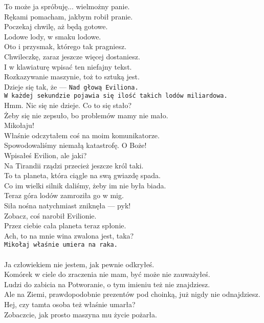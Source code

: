 \charmik{}
To może ja spróbuję... wielmożny panie.\\
Rękami pomacham, jakbym robił pranie.\\
Poczekaj chwilę, aż będą gotowe.\\
Lodowe lody, w smaku lodowe.\\
Oto i przysmak, którego tak pragniesz.\\
Chwileczkę, zaraz jeszcze więcej dostaniesz.\\
I w klawiaturę wpisać ten niefajny tekst.\\
Rozkazywanie maszynie, toż to sztuką jest.\\
Dzieje się tak, że --- \texttt{Nad głową Eviliona.\\
W każdej sekundzie pojawia się ilość takich lodów miliardowa.}\\
Hmm. Nic się nie dzieje. Co to się stało?\\
Żeby się nie zepsuło, bo problemów mamy nie mało.\\

\charnad{}
Mikołaju!\\
Właśnie odczytałem coś na moim komunikatorze. \\
Spowodowaliśmy niemałą katastrofę. O Boże!\\
Wpisałeś Evilion, ale jaki?\\
Na Tirandii rządzi przecież jeszcze król taki.\\
To ta planeta, która ciągle na swą gwiazdę spada.\\
Co im wielki silnik daliśmy, żeby im nie była biada.\\
Teraz góra lodów zamroziła go w mig.\\
Siła nośna natychmiast zniknęła --- pyk!\\

\charmik{}
Zobacz, coś narobił Evilionie.\\
Przez ciebie cała planeta teraz spłonie.\\

\chardok{}
Ach, to na mnie wina zwalona jest, taka?\\
\texttt{Mikołaj właśnie umiera na raka.}\\

\\

\charmik{}
Ja człowiekiem nie jestem, jak pewnie odkryłeś.\\
Komórek w ciele do zraczenia nie mam, być może nie zauważyłeś.\\
Ludzi do zabicia na Potworanie, o tym imieniu też nie znajdziesz.\\
Ale na Ziemi, prawdopodobnie prezentów pod choinką, już nigdy nie odnajdziesz.\\
Hej, czy tamta osoba też właśnie umarła?\\
Zobaczcie, jak prosto maszyna mu życie pożarła.\\

